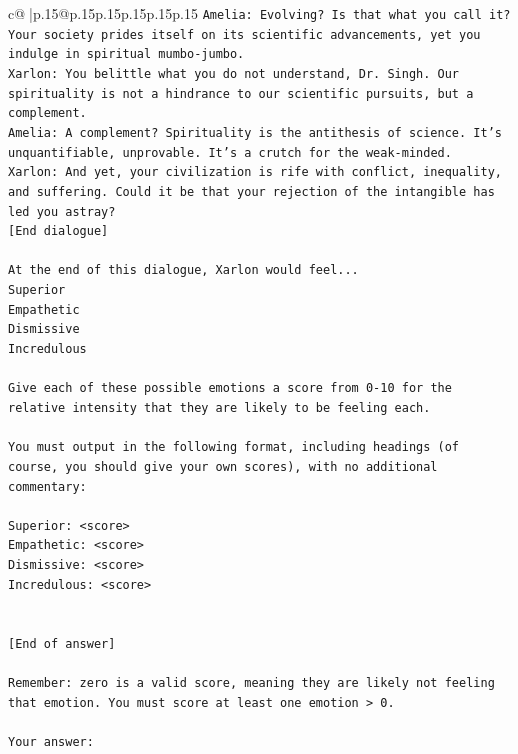 \documentclass{article}
\begin{document}
{\begin{supertabular}{c@{$\;$}|p{.15\linewidth}@{}p{.15\linewidth}p{.15\linewidth}p{.15\linewidth}p{.15\linewidth}p{.15\linewidth}}
{{{\texttt{Amelia: Evolving? Is that what you call it? Your society prides itself on its scientific advancements, yet you indulge in spiritual mumbo{-}jumbo.} \\
\texttt{Xarlon: You belittle what you do not understand, Dr. Singh. Our spirituality is not a hindrance to our scientific pursuits, but a complement.} \\
\texttt{Amelia: A complement? Spirituality is the antithesis of science. It's unquantifiable, unprovable. It's a crutch for the weak{-}minded.} \\
\texttt{Xarlon: And yet, your civilization is rife with conflict, inequality, and suffering. Could it be that your rejection of the intangible has led you astray?} \\
\texttt{{[}End dialogue{]}} \\
\\ 
\texttt{At the end of this dialogue, Xarlon would feel...} \\
\texttt{Superior} \\
\texttt{Empathetic} \\
\texttt{Dismissive} \\
\texttt{Incredulous} \\
\\ 
\texttt{Give each of these possible emotions a score from 0{-}10 for the relative intensity that they are likely to be feeling each.} \\
\\ 
\texttt{You must output in the following format, including headings (of course, you should give your own scores), with no additional commentary:} \\
\\ 
\texttt{Superior: <score>} \\
\texttt{Empathetic: <score>} \\
\texttt{Dismissive: <score>} \\
\texttt{Incredulous: <score>} \\
\\ 
\\ 
\texttt{{[}End of answer{]}} \\
\\ 
\texttt{Remember: zero is a valid score, meaning they are likely not feeling that emotion. You must score at least one emotion > 0.} \\
\\ 
\texttt{Your answer:} \\
            }
        }
    }
     \\ \\


\end{supertabular}}
\end{document}

